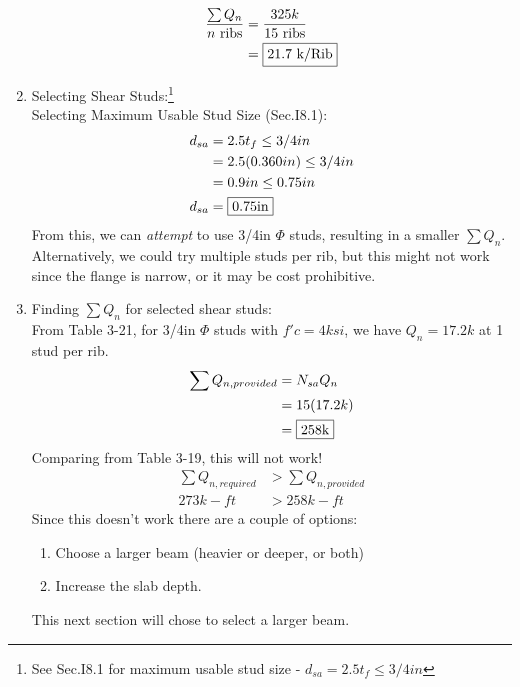 \documentclass{report} %
\begin{document}
\begin{enumerate}
        \begin{equation*}
            \begin{aligned}
                \frac{\sum Q_n}{n \text{ ribs}} &= \frac{325k}{15 \text{ ribs}} \\
                                                &= \framebox{21.7 \text{k/Rib}}
            \end{aligned}
        \end{equation*}
    \item Selecting Shear Studs:\footnote{See Sec.I8.1 for maximum usable stud size - $d_{sa} = 2.5t_f \leq 3/4in$} \\
        Selecting Maximum Usable Stud Size (Sec.I8.1): 
            \begin{equation*}
                \begin{aligned}
                    d_{sa} &= 2.5t_f \leq 3/4in \\
                            &= 2.5(0.360in) \leq 3/4in \\
                            &= 0.9in \leq 0.75in \\
                    d_{sa} &= \framebox{0.75in}
                \end{aligned}
            \end{equation*}
        From this, we can \emph{attempt} to use 3/4in $\Phi$ studs, resulting in a smaller $\sum Q_n$. Alternatively, we could try multiple studs per rib, but this might not work since the flange is narrow, or it may be cost prohibitive.  
    \item Finding $\sum Q_n$ for selected shear studs: \\
        From Table 3-21, for 3/4in $\Phi$ studs with $f'c = 4ksi$, we have $Q_n = 17.2k$ at 1 stud per rib.
            \begin{equation*}
                \begin{aligned}
                    \sum Q_{n,provided} &= N_{sa} Q_n \\
                                    &= 15(17.2k) \\
                                    &= \framebox{258k}
                \end{aligned}
            \end{equation*}
        Comparing from Table 3-19, this will not work! 
            \begin{equation*}
                \begin{aligned}
                    \sum Q_{n,required} &> \sum Q_{n,provided} \\
                    273k-ft &> 258k-ft
                \end{aligned}
            \end{equation*}
        Since this doesn't work there are a couple of options:
            \begin{enumerate}
                \item Choose a larger beam (heavier or deeper, or both)
                \item Increase the slab depth.
            \end{enumerate}
        This next section will chose to select a larger beam.
\end{enumerate}
\end{document}
